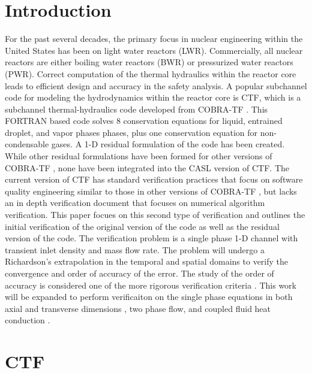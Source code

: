 \documentclass{mc2015}
\begin{document}
\clearpage

%

\section{Introduction}

For the past several decades, the primary focus in nuclear engineering within
the United States has been on light water reactors (LWR). Commercially,
all nuclear reactors are either boiling water reactors (BWR) or pressurized
water reactors (PWR). Correct computation of the thermal hydraulics within the
reactor core leads to efficient design and accuracy in the safety analysis. A
popular subchannel code for modeling the hydrodynamics within the reactor core
is CTF, which is a subchannel thermal-hydraulics code developed from
COBRA-TF \cite{Salko2014}. This FORTRAN based code solves 8 conservation
equations for liquid, entrained droplet, and vapor phases phases, plus one
conservation equation for non-condensable gases. A 1-D residual formulation of
the code has been created. While other residual formulations have been
formed for other versions of COBRA-TF \cite{Lloyd2014}, none have been
integrated into the CASL version of CTF. The current version of CTF has standard
verification practices that focus on software quality engineering similar to
those in other versions of COBRA-TF \cite{Aumiller2013}, but lacks an in
depth verification document that focuses on numerical algorithm verification.
This paper focues on this second type of verification and outlines the initial
verification of the original version of the code as well as the residual version
of the code. The verification problem is a single phase 1-D channel with
transient inlet density and mass flow rate. The problem will undergo a
Richardson's extrapolation in the temporal and spatial domains to verify the
convergence and order of accuracy of the error. The study of the order of
accuracy is considered one of the more rigorous verification criteria \cite{Roy2005}.
This work will be expanded to perform verificaiton on the single
phase equations in both axial and transverse dimensions \cite{Merroun2009}, two
phase flow, and coupled fluid heat conduction \cite{Mahadevan2009}.

\section{CTF}
\end{document}

